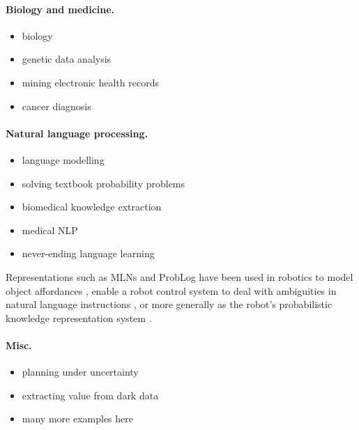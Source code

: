 \documentclass{article}
\begin{document}
\paragraph{Biology and medicine.}
\begin{itemize}
\item biology \cite{DBLP:journals/jcb/SakhanenkoG12}
\item genetic data analysis \cite{DBLP:journals/nar/MaeyerWRRM15}
\item mining electronic health records \cite{DBLP:conf/iaai/NatarajanKIJC13}
\item cancer diagnosis
  \cite{DBLP:conf/ilp/Corte-RealD017,DBLP:conf/pkdd/NassifKBPSC13}
\end{itemize}

\paragraph{Natural language processing.}
\begin{itemize}
\item language modelling \cite{DBLP:conf/icml/JerniteRS15}
\item solving textbook probability problems \cite{DBLP:conf/ijcai/DriesKDBR17}
\item biomedical knowledge extraction \cite{DBLP:conf/naacl/PoonV10}
\item medical NLP \cite{DBLP:conf/emnlp/VerbekeAMFDR12}
\item never-ending language learning \cite{DBLP:conf/aaai/CarlsonBKSHM10}
\end{itemize}

Representations such as MLNs and ProbLog have been used in robotics to model object affordances
\cite{DBLP:conf/icra/MoldovanMOSR12,DBLP:conf/iros/MoldovanR14,DBLP:conf/ilp/MoldovanORMS11},
enable a robot control system to deal with ambiguities in natural language
instructions \cite{DBLP:journals/ras/BeetzJMT10}, or more generally as the
robot's probabilistic knowledge representation system
\cite{DBLP:conf/icra/JainMB09}.

\paragraph{Misc.}
\begin{itemize}
\item planning under uncertainty \cite{DBLP:journals/jair/BoutilierDH99}
\item extracting value from dark data
  \cite{DBLP:journals/ijswis/NiuZRS12,DBLP:conf/emnlp/VenugopalCGN14}
\item many more examples here \cite{DBLP:series/synthesis/2016Raedt}
\end{itemize}
\end{document}
